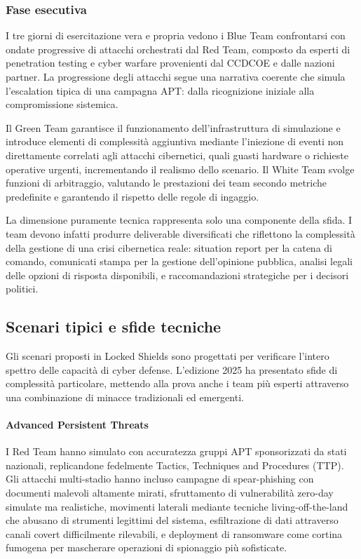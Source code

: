 \subsubsection{Fase esecutiva}
I tre giorni di esercitazione vera e propria vedono i Blue Team confrontarsi con ondate progressive di attacchi orchestrati dal Red Team, composto da esperti di penetration testing e cyber warfare provenienti dal CCDCOE e dalle nazioni partner. La progressione degli attacchi segue una narrativa coerente che simula l'escalation tipica di una campagna APT: dalla ricognizione iniziale alla compromissione sistemica.

Il Green Team garantisce il funzionamento dell'infrastruttura di simulazione e introduce elementi di complessità aggiuntiva mediante l'iniezione di eventi non direttamente correlati agli attacchi cibernetici, quali guasti hardware o richieste operative urgenti, incrementando il realismo dello scenario. Il White Team svolge funzioni di arbitraggio, valutando le prestazioni dei team secondo metriche predefinite e garantendo il rispetto delle regole di ingaggio.

La dimensione puramente tecnica rappresenta solo una componente della sfida. I team devono infatti produrre deliverable diversificati che riflettono la complessità della gestione di una crisi cibernetica reale: situation report per la catena di comando, comunicati stampa per la gestione dell'opinione pubblica, analisi legali delle opzioni di risposta disponibili, e raccomandazioni strategiche per i decisori politici.

\subsection{Scenari tipici e sfide tecniche}

Gli scenari proposti in Locked Shields sono progettati per verificare l'intero spettro delle capacità di cyber defense. L'edizione 2025 ha presentato sfide di complessità particolare, mettendo alla prova anche i team più esperti attraverso una combinazione di minacce tradizionali ed emergenti.

\paragraph{Advanced Persistent Threats}
I Red Team hanno simulato con accuratezza gruppi APT sponsorizzati da stati nazionali, replicandone fedelmente Tactics, Techniques and Procedures (TTP). Gli attacchi multi-stadio hanno incluso campagne di spear-phishing con documenti malevoli altamente mirati, sfruttamento di vulnerabilità zero-day simulate ma realistiche, movimenti laterali mediante tecniche living-off-the-land che abusano di strumenti legittimi del sistema, esfiltrazione di dati attraverso canali covert difficilmente rilevabili, e deployment di ransomware come cortina fumogena per mascherare operazioni di spionaggio più sofisticate.

